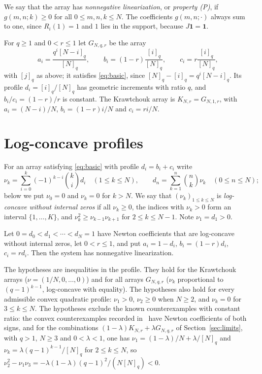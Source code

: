 We say that the array has \emph{nonnegative linearization}, or \emph{property (P)}, if $g(m,n;k)\geq0$ for all $0\leq m,n,k\leq N$. The coefficients $g(m,n;\cdot)$ always sum to one, since $R_i(1)=1$ and $1$ lies in the support, because $J\boldsymbol1=\boldsymbol1$.


For $q\geq1$ and $0<r\leq1$ let $G_{N,q,r}$ be the array
\begin{equation}\label{eq:parameters}
a_i=\frac{q^i[N-i]_q}{[N]_q},\qquad
b_i=(1-r)\frac{[i]_q}{[N]_q},\qquad
c_i=r\frac{[i]_q}{[N]_q},
\end{equation}
with $[j]_q$ as above; it satisfies \eqref{eq:basic}, since $[N]_q-[i]_q=q^i[N-i]_q$. Its profile $d_i=[i]_q/[N]_q$ has geometric increments with ratio $q$, and $b_i/c_i=(1-r)/r$ is constant. The Krawtchouk array is $K_{N,r}=G_{N,1,r}$, with $a_i=(N-i)/N$, $b_i=(1-r)i/N$ and $c_i=ri/N$.

\section{Log-concave profiles}\label{sec:lc}

For an array satisfying \eqref{eq:basic} with profile $d_i=b_i+c_i$ write
\[
\nu_k=\sum_{i=0}^k(-1)^{k-i}\binom ki d_i\quad(1\leq k\leq N),\qquad d_n=\sum_{k=1}^n\binom nk\nu_k\quad(0\leq n\leq N);
\]
below we put $\nu_0=0$ and $\nu_k=0$ for $k>N$.
We say that $(\nu_k)_{1\leq k\leq N}$ is \emph{log-concave without internal zeros} if all $\nu_k\geq0$, the indices with $\nu_k>0$ form an interval $\{1,\ldots,K\}$, and $\nu_k^2\geq\nu_{k-1}\nu_{k+1}$ for $2\leq k\leq N-1$. Note $\nu_1=d_1>0$.

\begin{theorem}\label{thm:lc}
Let $0=d_0<d_1<\cdots<d_N=1$ have Newton coefficients that are log-concave without internal zeros, let $0<r\leq1$, and put $a_i=1-d_i$, $b_i=(1-r)d_i$, $c_i=rd_i$. Then the system has nonnegative linearization.
\end{theorem}

The hypotheses are inequalities in the profile. They hold for the Krawtchouk arrays ($\nu=(1/N,0,\ldots,0)$) and for all arrays $G_{N,q,r}$ ($\nu_k$ proportional to $(q-1)^{k-1}$, log-concave with equality). The hypotheses also hold for every admissible convex quadratic profile: $\nu_1>0$, $\nu_2\geq0$ when $N\geq2$, and $\nu_k=0$ for $3\leq k\leq N$. The hypotheses exclude the known counterexamples with constant ratio: the convex counterexamples recorded in~\cite{P3} have Newton coefficients of both signs, and for the combinations $(1-\lambda)K_{N,r}+\lambda G_{N,q,r}$ of Section~\ref{sec:limits}, with $q>1$, $N\geq3$ and $0<\lambda<1$, one has $\nu_1=(1-\lambda)/N+\lambda/[N]_q$ and $\nu_k=\lambda(q-1)^{k-1}/[N]_q$ for $2\leq k\leq N$, so $\nu_2^2-\nu_1\nu_3=-\lambda(1-\lambda)(q-1)^2/(N[N]_q)<0$.

